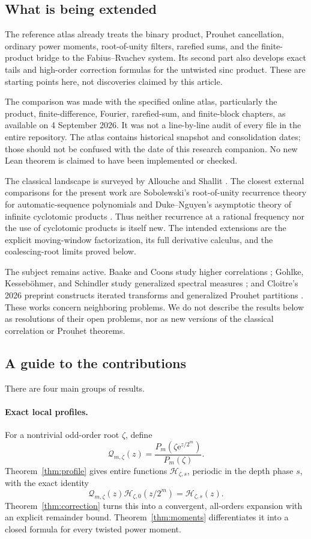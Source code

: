 \documentclass[11pt,letterpaper]{article}
\numberwithin{equation}{section}
\theoremstyle{definition}
\theoremstyle{remark}
\newcommand{\Hp}{\mathcal H}
\newcommand{\Qp}{\mathcal Q}
\newcommand{\e}{\mathrm e}
\begin{document}
\subsection{What is being extended}
The reference atlas \cite{atlas} already treats the binary product, Prouhet cancellation, ordinary power moments, root-of-unity filters, rarefied sums, and the finite-product bridge to the Fabius--Rvachev system. Its second part also develops exact tails and high-order correction formulas for the untwisted sinc product. These are starting points here, not discoveries claimed by this article.

The comparison was made with the specified online atlas, particularly the product, finite-difference, Fourier, rarefied-sum, and finite-block chapters, as available on 4 September 2026. It was not a line-by-line audit of every file in the entire repository. The atlas contains historical snapshot and consolidation dates; those should not be confused with the date of this research companion. No new Lean theorem is claimed to have been implemented or checked.

The classical landscape is surveyed by Allouche and Shallit \cite{allouche}. The closest external comparisons for the present work are Sobolewski's root-of-unity recurrence theory for automatic-sequence polynomials \cite{sobolewski} and Duke--Nguyen's asymptotic theory of infinite cyclotomic products \cite{duke}. Thus neither recurrence at a rational frequency nor the use of cyclotomic products is itself new. The intended extensions are the explicit moving-window factorization, its full derivative calculus, and the coalescing-root limits proved below.

The subject remains active. Baake and Coons study higher correlations \cite{baakecoons}; Gohlke, Kesseböhmer, and Schindler study generalized spectral measures \cite{gohlke}; and Cloitre's 2026 preprint constructs iterated transforms and generalized Prouhet partitions \cite{cloitre}. These works concern neighboring problems. We do not describe the results below as resolutions of their open problems, nor as new versions of the classical correlation or Prouhet theorems.

\subsection{A guide to the contributions}
There are four main groups of results.

\paragraph{Exact local profiles.}
For a nontrivial odd-order root \(\zeta\), define
\[
 \Qp_{m,\zeta}(z)=\frac{P_m(\zeta\e^{z/2^m})}{P_m(\zeta)}.
\]
Theorem~\ref{thm:profile} gives entire functions \(\Hp_{\zeta,s}\), periodic in the depth phase \(s\), with the exact identity
\[
 \Qp_{m,\zeta}(z)\Hp_{\zeta,0}(z/2^m)=\Hp_{\zeta,s}(z).
\]
Theorem~\ref{thm:correction} turns this into a convergent, all-orders expansion with an explicit remainder bound. Theorem~\ref{thm:moments} differentiates it into a closed formula for every twisted power moment.
\end{document}
